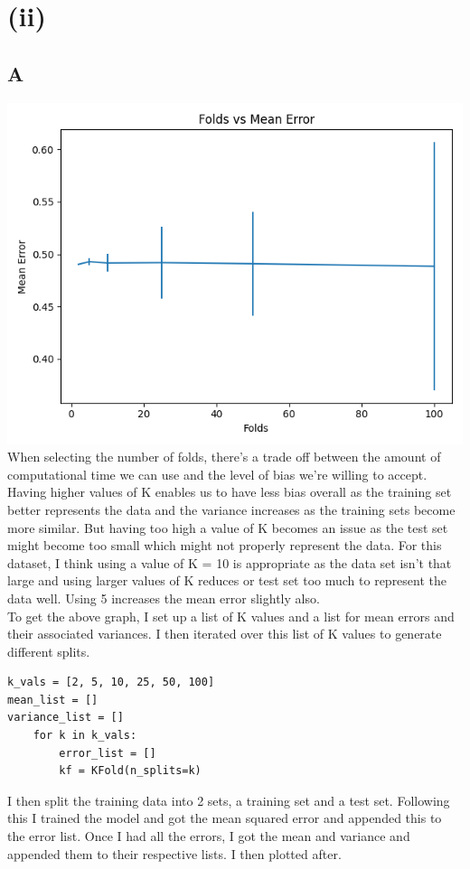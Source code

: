 \documentclass[11pt]{article} %
\begin{document}
\section{(ii)} 
\subsection{A}
\includegraphics[scale=0.5]{fold.jpg}
\\
When selecting the number of folds, there's a trade off between the amount of computational time we can use and the level of bias we're willing to accept. Having higher values of K enables us to have less bias overall as the training set better represents the data and the variance increases as the training sets become more similar. But having too high a value of K becomes an issue as the test set might become too small which might not properly represent the data. For this dataset, I think using a value of K = 10 is appropriate as the data set isn't that large and using larger values of K reduces or test set too much to represent the data well. Using 5 increases the mean error slightly also.
\\ To get the above graph, I set up a list of K values and a list for mean errors and their associated variances.  I then iterated over this list of K values to generate different splits.
\begin{verbatim}
k_vals = [2, 5, 10, 25, 50, 100]
mean_list = []
variance_list = []
    for k in k_vals:
        error_list = []
        kf = KFold(n_splits=k)
\end{verbatim}
I then split the training data into 2 sets, a training set and a test set. Following this I trained the model and got the mean squared error and appended this to the error list. Once I had all the errors, I got the mean and variance and appended them to their respective lists. I then plotted after.
\end{document}
